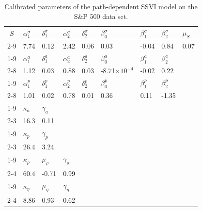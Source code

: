 \begin{table}[htbp]
    \centering
    \caption{Calibrated parameters of the path-dependent SSVI model on the S\&P 500 data set. }
    \label{tab:sp500_params}
    \begin{tabular}{@{}lllllllll@{}}
    \toprule
    \multicolumn{1}{c}{\multirow{2}{*}{$S$}} & $\alpha_1^{\sigma}$ & $\delta_1^{\sigma}$ & $\alpha_2^{\sigma}$ & $\delta_2^{\sigma}$ & $\beta_0^{\sigma}$ & $\beta_1^{\sigma}$ &  $\beta_2^{\sigma}$& $\mu_S$ \\ \cmidrule(l){2-9} 
    \multicolumn{1}{c}{}                   &7.74  & 0.12 & 2.42 & 0.06 & 0.03 & -0.04 & 0.84 & 0.07 \\ \cmidrule(r){1-9}
    \multicolumn{1}{c}{\multirow{2}{*}{$a$}} & $\alpha_1^{a}$ & $\delta_1^{a}$ & $\alpha_2^{a}$ & $\delta_2^{a}$ & $\beta_0^{a}$ & $\beta_1^{a}$ &  $\beta_2^{a}$ \\ \cmidrule(l){2-8} 
    \multicolumn{1}{c}{}                   &1.12  & 0.03 & 0.88 & 0.03 & -8.71$\times 10^{-4}$ & -0.02 & 0.22 \\ \cmidrule(r){1-9}
    \multicolumn{1}{c}{\multirow{2}{*}{$p$}} & $\alpha_1^{p}$ & $\delta_1^{p}$ & $\alpha_2^{p}$ & $\delta_2^{p}$ & $\beta_0^{p}$ & $\beta_1^{p}$ &  $\beta_2^{p}$ \\ \cmidrule(l){2-8} 
    \multicolumn{1}{c}{}                   &1.01  & 0.02 & 0.78 & 0.01 & 0.36 & 0.11 & -1.35 \\ \cmidrule(r){1-9}
    \multicolumn{1}{c}{\multirow{2}{*}{$\varepsilon^a$}} & $\kappa_a$ & $\gamma_a$  \\ \cmidrule(l){2-3} 
    \multicolumn{1}{c}{}                   &16.3  & 0.11  \\ \cmidrule(r){1-9} 
    \multicolumn{1}{c}{\multirow{2}{*}{$\varepsilon^p$}} & $\kappa_p$ & $\gamma_p$  \\ \cmidrule(l){2-3} 
    \multicolumn{1}{c}{}                   &26.4  & 3.24  \\ \cmidrule(r){1-9} 
    \multicolumn{1}{c}{\multirow{2}{*}{$\rho$}} & $\kappa_{\rho}$ & $\mu_{\rho}$ & $\gamma_{\rho}$  \\ \cmidrule(l){2-4} 
    \multicolumn{1}{c}{}                   &60.4  & -0.71 & 0.99  \\ \cmidrule(r){1-9} 
    \multicolumn{1}{c}{\multirow{2}{*}{$\eta$}} & $\kappa_{\eta}$ & $\mu_{\eta}$ & $\gamma_{\eta}$  \\ \cmidrule(l){2-4} 
    \multicolumn{1}{c}{}                   &8.86  & 0.93 & 0.62   \\ 
    \bottomrule
    \end{tabular}
    \end{table}

